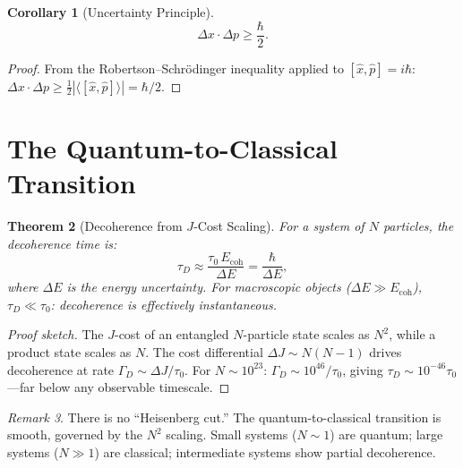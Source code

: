 \documentclass[12pt,a4paper]{article}
\newtheorem{theorem}{Theorem}[section]
\newtheorem{corollary}[theorem]{Corollary}
\theoremstyle{definition}
\theoremstyle{remark}
\newtheorem{remark}[theorem]{Remark}
\begin{document}
\begin{corollary}[Uncertainty Principle]
\begin{equation}
  \Delta x \cdot \Delta p \geq \frac{\hbar}{2}.
\end{equation}
\end{corollary}

\begin{proof}
From the Robertson--Schr\"odinger inequality applied to
$[\hat{x}, \hat{p}] = i\hbar$:
$\Delta x \cdot \Delta p \geq \tfrac{1}{2}
|\langle [\hat{x}, \hat{p}] \rangle| = \hbar/2$.
\end{proof}

\section{The Quantum-to-Classical Transition}
\label{sec:classical}

\begin{theorem}[Decoherence from $J$-Cost Scaling]
\label{thm:decoherence}
For a system of $N$ particles, the decoherence time is:
\begin{equation}
  \tau_D \approx \frac{\tau_0\,E_{\mathrm{coh}}}{\Delta E}
  = \frac{\hbar}{\Delta E},
\end{equation}
where $\Delta E$ is the energy uncertainty.  For macroscopic
objects ($\Delta E \gg E_{\mathrm{coh}}$), $\tau_D \ll \tau_0$:
decoherence is effectively instantaneous.
\end{theorem}

\begin{proof}[Proof sketch]
The $J$-cost of an entangled $N$-particle state scales as $N^2$,
while a product state scales as $N$.  The cost differential
$\Delta J \sim N(N-1)$ drives decoherence at rate
$\Gamma_D \sim \Delta J / \tau_0$.  For $N \sim 10^{23}$:
$\Gamma_D \sim 10^{46}/\tau_0$, giving $\tau_D \sim 10^{-46}
\tau_0$---far below any observable timescale.
\end{proof}

\begin{remark}
There is no ``Heisenberg cut.''  The quantum-to-classical
transition is smooth, governed by the $N^2$ scaling.  Small
systems ($N \sim 1$) are quantum; large systems
($N \gg 1$) are classical; intermediate systems show partial
decoherence.
\end{remark}

\end{document}
